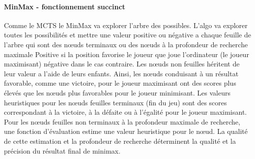 \paragraph {MinMax - fonctionnement succinct}
Comme le MCTS le MinMax va explorer l'arbre des possibles. L'algo va explorer toutes les possibilités et mettre une valeur positive ou négative
a chaque feuille de l'arbre qui sont des nœuds terminaux ou des nœuds à la profondeur de recherche maximale Positive si la position favorise le joueur 
que joue l'ordinateur (le joueur maximisant) négative dans le cas contraire. Les nœuds non feuilles héritent de leur valeur a l'aide de leurs enfants.
Ainsi, les nœuds conduisant à un résultat favorable, comme une victoire, pour le joueur maximisant ont des scores plus élevés que les nœuds 
plus favorables pour le joueur minimisant. Les valeurs heuristiques pour les nœuds feuilles terminaux (fin du jeu) sont des scores correspondant 
à la victoire, à la défaite ou à l'égalité pour le joueur maximisant. Pour les nœuds feuilles non terminaux à la profondeur maximale de recherche, 
une fonction d'évaluation estime une valeur heuristique pour le nœud. La qualité de cette estimation et la profondeur de recherche déterminent la 
qualité et la précision du résultat final de minimax.